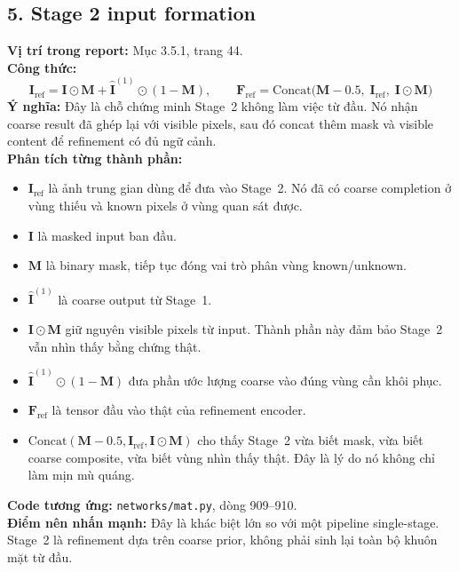 \documentclass[12pt,a4paper]{article}
\begin{document}
\subsection*{5. Stage 2 input formation}
\textbf{Vị trí trong report:} Mục 3.5.1, trang 44.\\
\textbf{Công thức:}
\[
\mathbf{I}_{\mathrm{ref}} = \mathbf{I} \odot \mathbf{M} + \hat{\mathbf{I}}^{(1)} \odot (1-\mathbf{M}),
\qquad
\mathbf{F}_{\mathrm{ref}} = \mathrm{Concat}\big(\mathbf{M} - 0.5,\; \mathbf{I}_{\mathrm{ref}},\; \mathbf{I}\odot\mathbf{M}\big)
\]
\textbf{Ý nghĩa:} Đây là chỗ chứng minh Stage~2 không làm việc từ đầu. Nó nhận coarse result đã ghép lại với visible pixels, sau đó concat thêm mask và visible content để refinement có đủ ngữ cảnh.\\
\textbf{Phân tích từng thành phần:}
\begin{itemize}[leftmargin=1.5em]
\item $\mathbf{I}_{\mathrm{ref}}$ là ảnh trung gian dùng để đưa vào Stage~2. Nó đã có coarse completion ở vùng thiếu và known pixels ở vùng quan sát được.
\item $\mathbf{I}$ là masked input ban đầu.
\item $\mathbf{M}$ là binary mask, tiếp tục đóng vai trò phân vùng known/unknown.
\item $\hat{\mathbf{I}}^{(1)}$ là coarse output từ Stage~1.
\item $\mathbf{I}\odot\mathbf{M}$ giữ nguyên visible pixels từ input. Thành phần này đảm bảo Stage~2 vẫn nhìn thấy bằng chứng thật.
\item $\hat{\mathbf{I}}^{(1)}\odot(1-\mathbf{M})$ đưa phần ước lượng coarse vào đúng vùng cần khôi phục.
\item $\mathbf{F}_{\mathrm{ref}}$ là tensor đầu vào thật của refinement encoder.
\item $\mathrm{Concat}(\mathbf{M}-0.5,\mathbf{I}_{\mathrm{ref}},\mathbf{I}\odot\mathbf{M})$ cho thấy Stage~2 vừa biết mask, vừa biết coarse composite, vừa biết vùng nhìn thấy thật. Đây là lý do nó không chỉ làm mịn mù quáng.
\end{itemize}
\textbf{Code tương ứng:} \texttt{networks/mat.py}, dòng 909--910.\\
\textbf{Điểm nên nhấn mạnh:} Đây là khác biệt lớn so với một pipeline single-stage. Stage~2 là refinement dựa trên coarse prior, không phải sinh lại toàn bộ khuôn mặt từ đầu.
\end{document}
